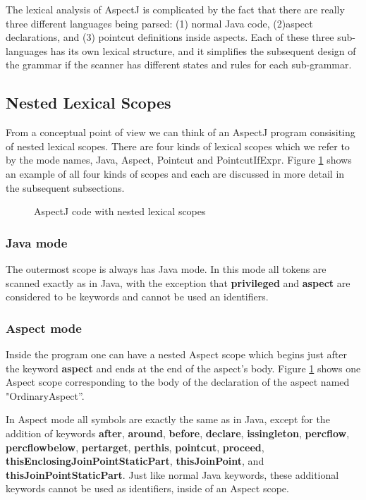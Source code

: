The lexical analysis of AspectJ is complicated by the fact that there are
really three different languages being parsed: (1) normal Java code,
(2)aspect declarations, and 
(3) pointcut definitions inside aspects.  
Each of these three sub-languages has its own lexical structure,  and it 
simplifies the subsequent design of the grammar if the scanner has different 
states and rules for each sub-grammar.

\subsection{Nested Lexical Scopes}
From a conceptual point of view we can think of an AspectJ program 
consisiting of nested lexical scopes.   There are four kinds of lexical
scopes which we refer to by the mode names, {\sc Java}, {\sc Aspect},
{\sc Pointcut} and {\sc PointcutIfExpr}.   
Figure \ref{FIG:LexExample} shows an example of all four kinds of scopes
and each are discussed in more detail in the subsequent subsections.   

\begin{figure}[htbp]

\caption{AspectJ code with nested lexical scopes \label{FIG:LexExample}}
\end{figure}

\subsubsection{{\sc Java} mode}
The outermost scope is always has
{\sc Java} mode.  In this mode all tokens are scanned exactly as in
Java, with the exception that {\bf privileged} and {\bf aspect} are
considered to be keywords and cannot be used an identifiers.

\subsubsection{{\sc Aspect} mode}
Inside the program one can have a nested {\sc Aspect} scope which begins
just after the keyword {\bf aspect} and ends at the end of the aspect's body.
Figure \ref{FIG:LexExample} shows one  {\sc Aspect} scope corresponding
to the body of the declaration of the aspect named "OrdinaryAspect''. 

In {\sc Aspect} mode all symbols are exactly
the same as in Java,  except for the addition of  keywords
{\bf after}, {\bf around}, {\bf before}, {\bf declare}, 
{\bf issingleton}, {\bf percflow}, {\bf percflowbelow}, {\bf pertarget},
{\bf perthis}, {\bf pointcut}, {\bf proceed}, 
{\bf thisEnclosingJoinPointStaticPart}, {\bf thisJoinPoint}, and
{\bf thisJoinPointStaticPart}.   Just like normal Java keywords, these
additional keywords cannot be used as identifiers, inside of an
{\sc Aspect} scope.

